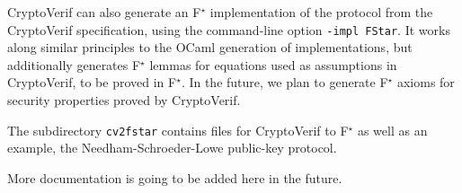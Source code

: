 CryptoVerif can also generate an F$^\star$ implementation of the protocol
from the CryptoVerif specification, using the command-line
option \texttt{-impl FStar}.
It works along similar principles to the OCaml generation of implementations,
but additionally generates F$^\star$ lemmas for equations used as
assumptions in CryptoVerif, to be proved in F$^\star$.
In the future, we plan to generate F$^\star$ axioms for security properties
proved by CryptoVerif.

The subdirectory \texttt{cv2fstar} contains files for CryptoVerif to F$^\star$
as well as an example, the Needham-Schroeder-Lowe public-key protocol.

More documentation is going to be added here in the future.
